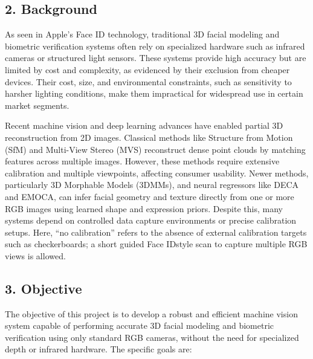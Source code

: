 \documentclass[12pt]{article}
\begin{document}
\vspace{2em}

\subsection*{2. Background}
As seen in Apple's Face ID technology, traditional 3D facial modeling and biometric verification systems often rely on specialized hardware such as infrared cameras or structured light sensors. These systems provide high accuracy but are limited by cost and complexity, as evidenced by their exclusion from cheaper devices. Their cost, size, and environmental constraints, such as sensitivity to harsher lighting conditions, make them impractical for widespread use in certain market segments.

Recent machine vision and deep learning advances have enabled partial 3D reconstruction from 2D images. Classical methods like Structure from Motion (SfM) and Multi-View Stereo (MVS) reconstruct dense point clouds by matching features across multiple images. However, these methods require extensive calibration and multiple viewpoints, affecting consumer usability. Newer methods, particularly 3D Morphable Models (3DMMs), and neural regressors like DECA and EMOCA, can infer facial geometry and texture directly from one or more RGB images using learned shape and expression priors. Despite this, many systems depend on controlled data capture environments or precise calibration setups. Here, ``no calibration'' refers to the absence of external calibration targets such as checkerboards; a short guided Face ID\textendash{}style scan to capture multiple RGB views is allowed.

\vspace{2em}

\subsection*{3. Objective}
The objective of this project is to develop a robust and efficient machine vision system capable of performing accurate 3D facial modeling and biometric verification using only standard RGB cameras, without the need for specialized depth or infrared hardware. The specific goals are:
\end{document}
